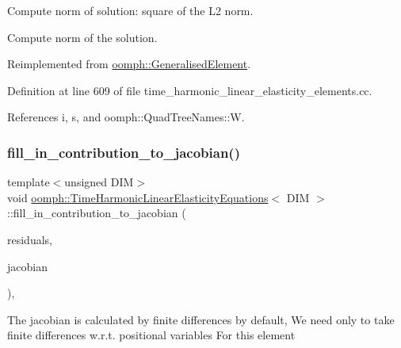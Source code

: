 Compute norm of solution\+: square of the L2 norm. 

Compute norm of the solution. 

Reimplemented from \hyperlink{classoomph_1_1GeneralisedElement_af2025a472df6752a946739da58e7fb37}{oomph\+::\+Generalised\+Element}.



Definition at line 609 of file time\+\_\+harmonic\+\_\+linear\+\_\+elasticity\+\_\+elements.\+cc.



References i, s, and oomph\+::\+Quad\+Tree\+Names\+::W.

\mbox{\label{classoomph_1_1TimeHarmonicLinearElasticityEquations_a546ed8d0a485289fa94c0835be57a771}} 
\subsubsection{\texorpdfstring{fill\+\_\+in\+\_\+contribution\+\_\+to\+\_\+jacobian()}{fill\_in\_contribution\_to\_jacobian()}}
{\footnotesize\ttfamily template$<$unsigned D\+IM$>$ \\
void \hyperlink{classoomph_1_1TimeHarmonicLinearElasticityEquations}{oomph\+::\+Time\+Harmonic\+Linear\+Elasticity\+Equations}$<$ D\+IM $>$\+::fill\+\_\+in\+\_\+contribution\+\_\+to\+\_\+jacobian (\begin{DoxyParamCaption}\item[{\hyperlink{classoomph_1_1Vector}{Vector}$<$ double $>$ \&}]{residuals,  }\item[{\hyperlink{classoomph_1_1DenseMatrix}{Dense\+Matrix}$<$ double $>$ \&}]{jacobian }\end{DoxyParamCaption})\hspace{0.3cm}{\ttfamily [inline]}, {\ttfamily [virtual]}}

The jacobian is calculated by finite differences by default, We need only to take finite differences w.\+r.\+t. positional variables For this element 

